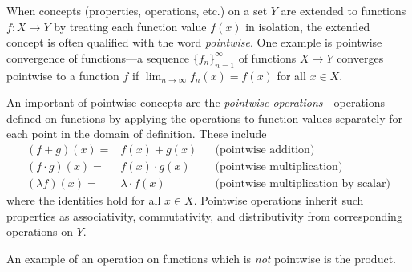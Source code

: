 \documentclass[12pt]{article}
\begin{document}
When concepts (properties, operations, etc.) on a set $Y$ 
are extended to functions $f\colon X \longrightarrow Y$ 
by treating each function value $f(x)$ in isolation, the 
extended concept is often qualified with the word 
\emph{pointwise}. One example is pointwise convergence 
of functions---a sequence $\{f_n\}_{n=1}^\infty$ of 
functions $X \longrightarrow Y$ converges pointwise to 
a function $f$ if \(\lim_{n \rightarrow \infty} f_n(x) = f(x)\) 
for all \(x \in X\).

An important  of pointwise concepts 
are the \emph{pointwise operations}---operations defined 
on functions by applying the operations to function values 
separately for each point in the domain of definition. These 
include
\begin{align*}
  (f+g)(x) ={}& f(x)+g(x) && \text{(pointwise addition)}\\
  (f \cdot g)(x) ={}& f(x) \cdot g(x) &&
    \text{(pointwise multiplication)}\\
  (\lambda f)(x) ={}& \lambda \cdot f(x) &&
    \text{(pointwise multiplication by scalar)}
\end{align*}
where the identities hold for all \(x \in X\). Pointwise 
operations inherit such properties as associativity, commutativity, 
and distributivity from corresponding operations on $Y$.

An example of an operation on functions which is \emph{not} 
pointwise is the  product.
\end{document}
